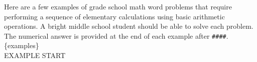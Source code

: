 \begin{tcolorbox}[colback=blue!5!white,colframe=blue!60!white,title=Base Prompt]
Here are a few examples of grade school math word problems that require performing a sequence of elementary calculations using basic arithmetic operations. A bright middle school student should be able to solve each problem. The numerical answer is provided at the end of each example after \texttt{\#\#\#\#}.\\

\{examples\}\\

EXAMPLE START
\end{tcolorbox}
